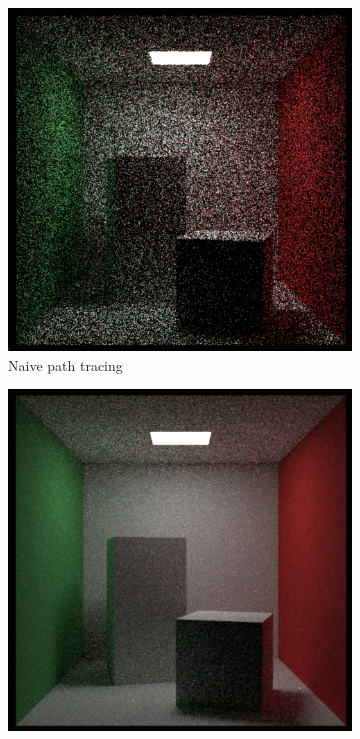 \documentclass[12pt]{article}
\begin{document}
\begin{figure}[H]
    \centering
    \begin{subfigure}[t]{0.32\textwidth}
        \centering
        \includegraphics[width=\textwidth]{images/25_samp/randomPDF.png}
        \caption{Naive path tracing}
        \label{fig:naive_sampling}
    \end{subfigure}
    \hfill
    \begin{subfigure}[t]{0.32\textwidth}
        \centering
        \includegraphics[width=\textwidth]{images/25_samp/combPDF.png}

\end{subfigure}
\end{figure}
\end{document}
